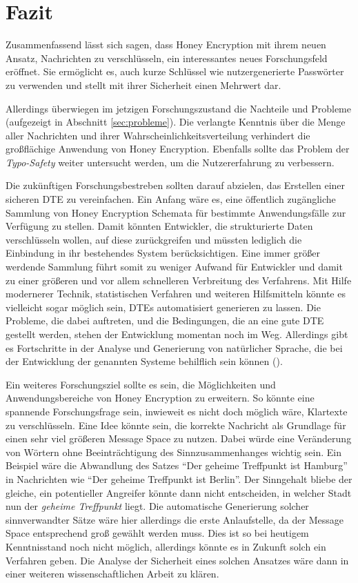\section{Fazit}
\label{sec:fazit}
Zusammenfassend lässt sich sagen, dass Honey Encryption mit ihrem neuen Ansatz, Nachrichten zu verschlüsseln, ein interessantes neues Forschungsfeld eröffnet. Sie ermöglicht es, auch kurze Schlüssel wie nutzergenerierte Passwörter zu verwenden und stellt mit ihrer Sicherheit einen Mehrwert dar.

Allerdings überwiegen im jetzigen Forschungszustand die Nachteile und Probleme (aufgezeigt in Abschnitt \ref{sec:probleme}). Die verlangte Kenntnis über die Menge aller Nachrichten und ihrer Wahrscheinlichkeitsverteilung verhindert die großflächige Anwendung von Honey Encryption. Ebenfalls sollte das Problem der \emph{Typo-Safety} weiter untersucht werden, um die Nutzererfahrung zu verbessern.

Die zukünftigen Forschungsbestreben sollten darauf abzielen, das Erstellen einer sicheren DTE zu vereinfachen. Ein Anfang wäre es, eine öffentlich zugängliche Sammlung von Honey Encryption Schemata für bestimmte Anwendungsfälle zur Verfügung zu stellen. Damit könnten Entwickler, die strukturierte Daten verschlüsseln wollen, auf diese zurückgreifen und müssten lediglich die Einbindung in ihr bestehendes System berücksichtigen. Eine immer größer werdende Sammlung führt somit zu weniger Aufwand für Entwickler und damit zu einer größeren und vor allem schnelleren Verbreitung des Verfahrens. Mit Hilfe modernerer Technik, statistischen Verfahren und weiteren Hilfsmitteln könnte es vielleicht sogar möglich sein, DTEs automatisiert generieren zu lassen. Die Probleme, die dabei auftreten, und die Bedingungen, die an eine gute DTE gestellt werden, stehen der Entwicklung momentan noch im Weg. Allerdings gibt es Fortschritte in der Analyse und Generierung von natürlicher Sprache, die bei der Entwicklung der genannten Systeme behilflich sein können (\cite{CRCS2014}).

Ein weiteres Forschungsziel sollte es sein, die Möglichkeiten und Anwendungsbereiche von Honey Encryption zu erweitern. So könnte eine spannende Forschungsfrage sein, inwieweit es nicht doch möglich wäre, Klartexte zu verschlüsseln. Eine Idee könnte sein, die korrekte Nachricht als Grundlage für einen sehr viel größeren Message Space zu nutzen. Dabei würde eine Veränderung von Wörtern ohne Beeinträchtigung des Sinnzusammenhanges wichtig sein. Ein Beispiel wäre die Abwandlung des Satzes ``Der geheime Treffpunkt ist Hamburg'' in Nachrichten wie ``Der geheime Treffpunkt ist Berlin''. Der Sinngehalt bliebe der gleiche, ein potentieller Angreifer könnte dann nicht entscheiden, in welcher Stadt nun der \emph{geheime Treffpunkt} liegt. Die automatische Generierung solcher sinnverwandter Sätze wäre hier allerdings die erste Anlaufstelle, da der Message Space entsprechend groß gewählt werden muss. Dies ist so bei heutigem Kenntnisstand noch nicht möglich, allerdings könnte es in Zukunft solch ein Verfahren geben. Die Analyse der Sicherheit eines solchen Ansatzes wäre dann in einer weiteren wissenschaftlichen Arbeit zu klären.

